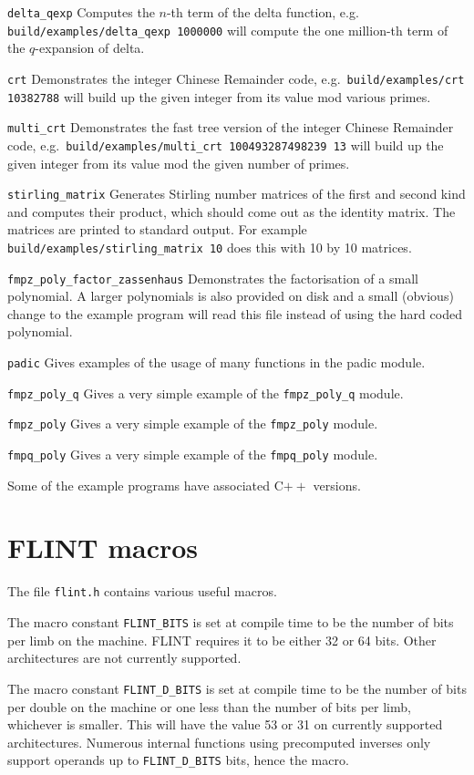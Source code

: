 \documentclass[a4paper,10pt]{book}
\newcommand{\code}{\lstinline}
\begin{document}
\code{delta_qexp}  Computes the $n$-th term of the delta function, e.g.\\
\code{build/examples/delta_qexp 1000000} will compute the one million-th
term of the $q$-expansion of delta.

\code{crt}  Demonstrates the integer Chinese Remainder code, e.g.\
\code{build/examples/crt 10382788} will build up the given integer from
its value mod various primes.

\code{multi_crt}  Demonstrates the fast tree version of the integer Chinese
Remainder code, e.g.\
\code{build/examples/multi_crt 100493287498239 13} will build up the given
integer from its value mod the given number of primes.

\code{stirling_matrix}  Generates Stirling number matrices of the first
and second kind and computes their product, which should come out as the
identity matrix. The matrices are printed to standard output.
For example \code{build/examples/stirling_matrix 10} does this
with 10 by 10 matrices.

\code{fmpz_poly_factor_zassenhaus} Demonstrates the factorisation of a
small polynomial. A larger polynomials is also provided on disk and a
small (obvious) change to the example program will read this file instead
of using the hard coded polynomial.

\code{padic} Gives examples of the usage of many functions in the padic
module.

\code{fmpz_poly_q} Gives a very simple example of the \code{fmpz_poly_q}
module.

\code{fmpz_poly} Gives a very simple example of the \code{fmpz_poly}
module.

\code{fmpq_poly} Gives a very simple example of the \code{fmpq_poly}
module.

Some of the example programs have associated C$++$ versions.

\chapter{FLINT macros}

The file \code{flint.h} contains various useful macros.

The macro constant \code{FLINT_BITS} is set at compile time to be the
number of bits per limb on the machine.  FLINT requires it to be either
32 or 64 bits.  Other architectures are not currently supported.

The macro constant \code{FLINT_D_BITS} is set at compile time to be the
number of bits per double on the machine or one less than the number of
bits per limb, whichever is smaller.  This will have the value 53 or 31
on currently supported architectures.  Numerous internal functions using
precomputed inverses only support operands up to \code{FLINT_D_BITS} bits,
hence the macro.
\end{document}
